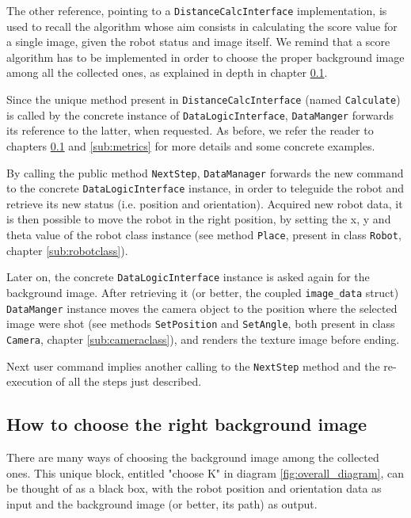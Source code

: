 %
The other reference, pointing to a \texttt{DistanceCalcInterface} implementation, is used to recall the algorithm
whose aim consists in calculating the score value for a single image, given the robot status and image itself. We
remind that a score algorithm has to be implemented in order to choose the proper background image among all the
collected ones, as explained in depth in chapter \ref{sub:howbackgroundimage}.
%

%
Since the unique method present in \texttt{DistanceCalcInterface} (named \texttt{Calculate}) is called by the
concrete instance of \texttt{DataLogicInterface}, \newline \texttt{DataManger} forwards its reference to the latter,
when requested. As before, we refer the reader to chapters \ref{sub:howbackgroundimage} and \ref{sub:metrics} for
more details and some concrete examples.
%

%
By calling the public method \texttt{NextStep}, \texttt{DataManager} forwards the new command to the concrete
\texttt{DataLogicInterface} instance, in order to teleguide the robot and retrieve its new status
(i.e. position and orientation). Acquired new robot data, it is then possible to move the robot in the
right position, by setting the x, y and theta value of the robot class instance (see method \texttt{Place},
present in class \texttt{Robot}, chapter \ref{sub:robotclass}).
%

%
Later on, the concrete \texttt{DataLogicInterface} instance is asked again for the background image. After
retrieving it (or better, the coupled \texttt{image\_data} struct) \texttt{DataManger} instance moves the camera
object to the position where the selected image were shot (see methods \texttt{SetPosition} and \texttt{SetAngle},
both present in class \texttt{Camera}, chapter \ref{sub:cameraclass}), and renders the texture image before ending.
%

%
Next user command implies another calling to the \texttt{NextStep} method and the re-execution of all the steps just
described.

\subsection{How to choose the right background image}
\label{sub:howbackgroundimage}

There are many ways of choosing the background image among the collected ones. This unique
block, entitled "choose K" in diagram \ref{fig:overall_diagram}, can be thought of as a
black box, with the robot position and orientation data as input and the background image
(or better, its path) as output.
%

